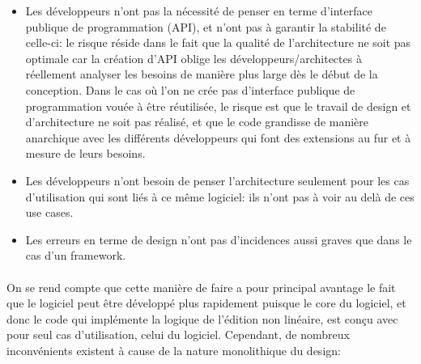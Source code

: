 \begin{itemize} \setlength{\itemsep}{2mm}

  \item {Les développeurs n'ont pas la nécessité de penser
    en terme d'interface publique de programmation (API), et
    n'ont pas à garantir la stabilité de celle-ci: le risque réside
    dans le fait que la qualité de l'architecture ne soit pas optimale
    car la création d'API oblige les développeurs/architectes
    à réellement analyser les besoins de manière plus large dès
    le début de la conception. Dans le cas où l'on ne crée pas
    d'interface publique de programmation vouée à être réutilisée,
    le risque est que le travail de design et d'architecture ne soit
    pas réalisé, et que le code grandisse de manière anarchique avec
    les différents développeurs qui font des extensions au fur et à
    mesure de leurs besoins.}

  \item {Les développeurs n'ont besoin de penser l'architecture seulement
  pour les cas d'utilisation qui sont liés à ce même logiciel:
    ils n'ont pas à voir au delà de ces use cases.}

  \item {Les erreurs en terme de design n'ont pas d'incidences aussi
    graves que dans le cas d'un framework.}
\end {itemize}

\paragraph{}

On se rend compte que cette manière de faire a pour principal avantage
le fait que le logiciel peut être développé plus rapidement puisque
le core du logiciel, et donc le code qui implémente la logique de
l'édition non linéaire, est conçu avec pour seul cas d'utilisation,
celui du logiciel. Cependant, de nombreux inconvénients existent à
cause de la nature monolithique du design:

